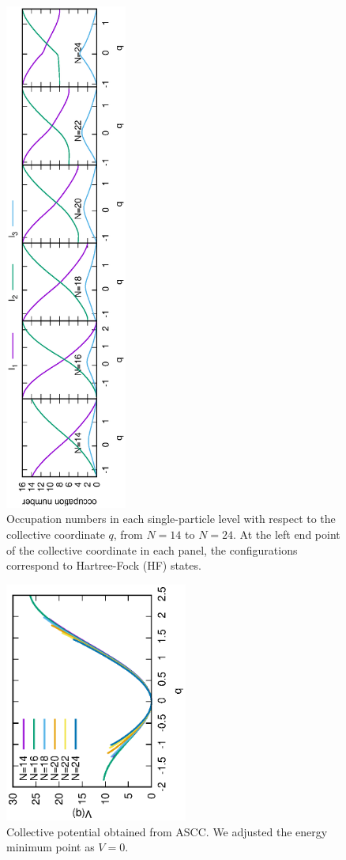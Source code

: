 \documentclass[%
superscriptaddress,
showpacs,
nofootinbib,
amsmath,amssymb,
aps,
prc,
twocolumn,
floatfix ]%
{revtex4-1}
\begin{document}
\begin{figure}[t]
 \begin{center}
  \includegraphics[width=40mm,angle=-90]{occ_number.eps}
 \end{center}
	\caption{Occupation numbers in each single-particle level with respect to the collective coordinate $q$, from $N=14$ to $N=24$. At the left end point of the collective coordinate in each panel, the configurations correspond to Hartree-Fock (HF) states.
}
 \label{occ_number}
\end{figure}
\begin{figure}[htbp]
 \begin{center}
  \includegraphics[width=60mm,angle=-90]{potential.eps}
 \end{center}
	\caption{Collective potential obtained from ASCC. We adjusted the energy minimum point as $V=0$.
}
 \label{potential}
\end{figure}
\end{document}
